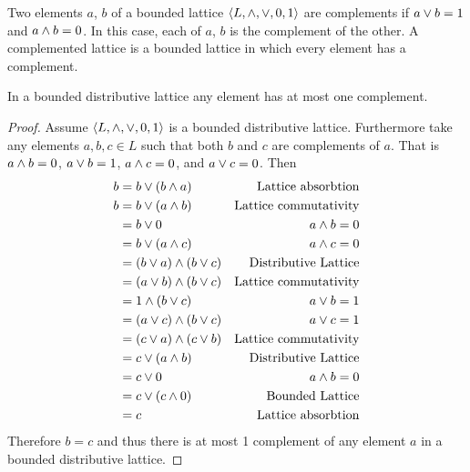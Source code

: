\begin{definition*}
Two elements $a$, $b$ of a bounded lattice $\langle L, \wedge, \vee, 0, 1\rangle$ are complements if $a \vee b = 1$ and $a\wedge b = 0$.
In this case, each of $a$, $b$ is the complement of the other.
A complemented lattice is a bounded lattice in which every element has a complement.
\end{definition*}

\begin{theorem*}
In a bounded distributive lattice any element has at most one complement.
\end{theorem*}

\begin{proof}
Assume $\langle L, \wedge, \vee, 0, 1 \rangle$ is a bounded distributive lattice.
Furthermore take any elements $a, b, c \in L$ such that both $b$ and $c$ are complements of $a$.
That is $a\wedge b = 0$, $a\vee b = 1$, $a\wedge c = 0$, and $a\vee c = 0$.
Then
\begin{align*}
  b &= b \vee (b \wedge a)           & \text{Lattice absorbtion} \\
  b &= b \vee (a \wedge b)           & \text{Lattice commutativity} \\
    &= b \vee 0                     & \text{$a\wedge b = 0$} \\
    &= b \vee (a \wedge c)           & \text{$a\wedge c = 0$} \\
    &= (b \vee a) \wedge (b \vee c) & \text{Distributive Lattice} \\
    &= (a \vee b) \wedge (b \vee c) & \text{Lattice commutativity} \\
    &= 1 \wedge (b \vee c)           & \text{$a\vee b = 1$} \\
    &= (a \vee c) \wedge (b \vee c) & \text{$a\vee c = 1$} \\
    &= (c \vee a) \wedge (c \vee b) & \text{Lattice commutativity} \\
    &= c \vee (a \wedge b)           & \text{Distributive Lattice} \\
    &= c \vee 0                     & \text{$a\wedge b = 0$} \\
    &= c \vee (c \wedge 0)           & \text{Bounded Lattice} \\
    &= c                             & \text{Lattice absorbtion}
\end{align*}
Therefore $b = c$ and thus there is at most 1 complement of any element $a$ in a bounded distributive lattice.
\end{proof}
